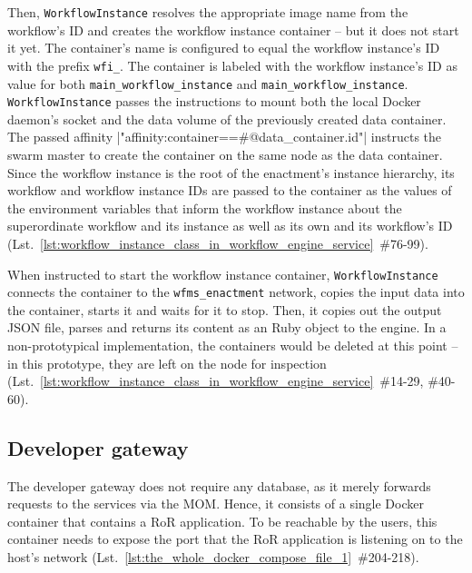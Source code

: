     Then, \texttt{WorkflowInstance} resolves the appropriate image name from the workflow's \ac{ID} and creates the workflow instance container -- but it does not start it yet. The container's name is configured to equal the workflow instance's \ac{ID} with the prefix \texttt{wfi\_}. The container is labeled with the workflow instance's \ac{ID} as value for both \texttt{main\_workflow\_instance} and \texttt{main\_workflow\_instance}. \texttt{WorkflowInstance} passes the instructions to mount both the local Docker daemon's socket and the data volume of the previously created data container. The passed affinity
    |"affinity:container==#{@data_container.id}"|
    instructs the swarm master to create the container on the same node as the data container. Since the workflow instance is the root of the enactment's instance hierarchy, its workflow and workflow instance \acp{ID} are passed to the container as the values of the environment variables that inform the workflow instance about the superordinate workflow and its instance as well as its own and its workflow's \ac{ID} (Lst.~\ref{lst:workflow_instance_class_in_workflow_engine_service}~\#76-99).

    When instructed to start the workflow instance container, \texttt{WorkflowInstance} connects the container to the \texttt{wfms\_enactment} network, copies the input data into the container, starts it and waits for it to stop.
    Then, it copies out the output \ac{JSON} file, parses and returns its content as an Ruby object to the engine. In a non-prototypical implementation, the containers would be deleted at this point -- in this prototype, they are left on the node for inspection (Lst.~\ref{lst:workflow_instance_class_in_workflow_engine_service}~\#14-29, \#40-60).

  \subsection{Developer gateway} %
    \label{sub:developer_gateway}
    The developer gateway does not require any database, as it merely forwards requests to the services via the \ac{MOM}. Hence, it consists of a single Docker container that contains a \ac{RoR} application. To be reachable by the users, this container needs to expose the port that the \ac{RoR} application is listening on to the host's network (Lst.~\ref{lst:the_whole_docker_compose_file_1}~\#204-218).

